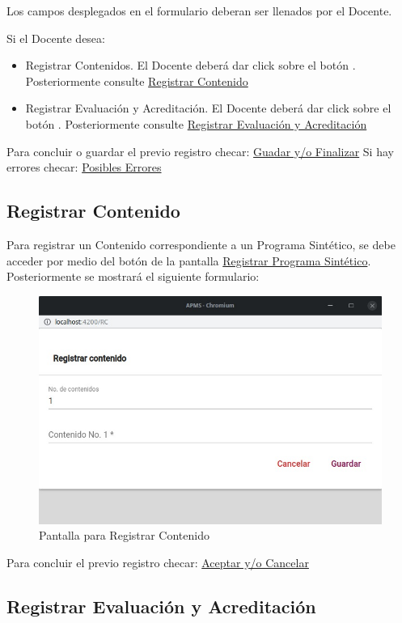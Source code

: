 Los campos desplegados en el formulario deberan ser llenados por el Docente.

Si el Docente desea:

\begin{itemize}
    \item Registrar Contenidos. El Docente deberá dar click sobre el botón . Posteriormente consulte \hyperlink{RegC}{Registrar Contenido}
    \item Registrar Evaluación y Acreditación. El Docente deberá dar click sobre el botón . Posteriormente consulte \hyperlink{RegEyA}{Registrar Evaluación y Acreditación}
\end{itemize}

Para concluir o guardar el previo registro checar:
\hyperlink{GuardarFinalizar}{Guadar y/o Finalizar}
\pagebreak
Si hay errores checar: \hyperlink{Errores}{Posibles Errores}
\pagebreak

\hypertarget{RegC}{\subsection{Registrar Contenido}}

Para registrar un Contenido correspondiente a un Programa Sintético, se debe acceder por medio del botón  de la pantalla \hyperlink{RegistrarPS}{Registrar Programa Sintético}. Posteriormente se mostrará el siguiente formulario:

\begin{figure}[H]
    \centering
    \hypertarget{RegC}{\includegraphics[width=0.5\linewidth]{images/SP6/11.jpeg}}
    \caption{Pantalla para Registrar Contenido}
\end{figure}
Para concluir el previo registro checar:
\hyperlink{AceptarCancelar}{Aceptar y/o Cancelar}

\pagebreak
\hypertarget{RegEyA}{\subsection{Registrar Evaluación y Acreditación}}


